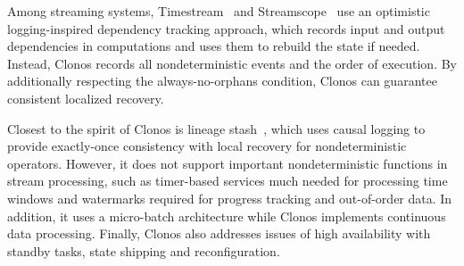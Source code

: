 \documentclass[sigconf]{acmart}
\begin{document}
Among streaming systems, Timestream~\cite{QianHS13} and Streamscope~\cite{LinHZ16} use an optimistic logging-inspired dependency tracking approach, which records input and output dependencies in computations and uses them to rebuild the state if needed.
Instead, Clonos records all nondeterministic events and the order of execution. By additionally respecting the always-no-orphans condition, Clonos can guarantee consistent localized recovery.

Closest to the spirit of Clonos is lineage stash~\cite{wang2019lineage}, which uses causal logging to provide exactly-once consistency with local recovery for nondeterministic operators. However, it does not support important nondeterministic functions in stream processing, such as timer-based services much needed for processing time windows and watermarks required for progress tracking and out-of-order data.
In addition, it uses a micro-batch architecture while Clonos implements continuous data processing. Finally, Clonos also addresses issues of high availability with standby tasks, state shipping and reconfiguration.


\end{document}
